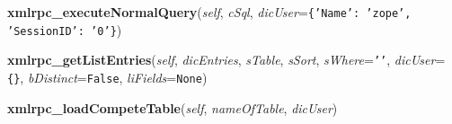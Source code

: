 \hspace{.8\funcindent}\begin{boxedminipage}{\funcwidth}

    \raggedright \textbf{xmlrpc\_executeNormalQuery}(\textit{self}, \textit{cSql}, \textit{dicUser}={\tt \texttt{\{}\texttt{'}\texttt{Name}\texttt{'}\texttt{: }\texttt{'}\texttt{zope}\texttt{'}\texttt{, }\texttt{'}\texttt{SessionID}\texttt{'}\texttt{: }\texttt{'}\texttt{0}\texttt{'}\texttt{\}}})

\setlength{\parskip}{2ex}
\setlength{\parskip}{1ex}
    \end{boxedminipage}

    \label{cuon:SQL:SQL:xmlrpc_getListEntries}

    \vspace{0.5ex}

\hspace{.8\funcindent}\begin{boxedminipage}{\funcwidth}

    \raggedright \textbf{xmlrpc\_getListEntries}(\textit{self}, \textit{dicEntries}, \textit{sTable}, \textit{sSort}, \textit{sWhere}={\tt \texttt{'}\texttt{}\texttt{'}}, \textit{dicUser}={\tt \texttt{\{}\texttt{\}}}, \textit{bDistinct}={\tt False}, \textit{liFields}={\tt None})

\setlength{\parskip}{2ex}
\setlength{\parskip}{1ex}
    \end{boxedminipage}

    \label{cuon:SQL:SQL:xmlrpc_loadCompeteTable}

    \vspace{0.5ex}

\hspace{.8\funcindent}\begin{boxedminipage}{\funcwidth}

    \raggedright \textbf{xmlrpc\_loadCompeteTable}(\textit{self}, \textit{nameOfTable}, \textit{dicUser})

\setlength{\parskip}{2ex}
\setlength{\parskip}{1ex}
    \end{boxedminipage}

    \label{cuon:SQL:SQL:xmlrpc_loadRecord}

